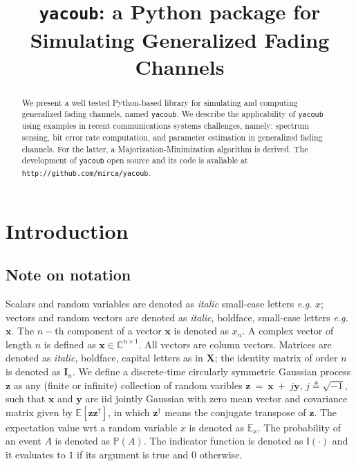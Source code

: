 \documentclass[conference, 10pt]{IEEEtran}
\begin{document}
\title{\texttt{yacoub}: a Python package for Simulating Generalized Fading Channels}

\author{
}

\maketitle

\begin{abstract}
    We present a well tested Python-based library for simulating and computing
    generalized fading channels, named \texttt{yacoub}. We describe the
    applicability of \texttt{yacoub} using examples in recent communications
    systems challenges, namely: spectrum sensing, bit error rate computation,
    and parameter estimation in generalized fading channels. For the latter,
    a Majorization-Minimization algorithm is derived. The development of
    \texttt{yacoub} open source and its code is avaliable at
    \texttt{http://github.com/mirca/yacoub}.
\end{abstract}

\IEEEpeerreviewmaketitle
\section{Introduction}

\subsection{Note on notation}
Scalars and random variables are denoted as \textit{italic} small-case letters \textit{e.g.} $x$;
vectors and random vectors are denoted as \textit{italic}, boldface, small-case letters \textit{e.g.} $\bm{x}$.
The $n-$th component of a vector $\bm{x}$ is denoted as $x_n$.
A complex vector of length $n$ is defined as $\bm{x} \in \mathbb{C}^{n\times 1}$. All
vectors are column vectors. Matrices are denoted as \textit{italic}, boldface, capital
letters as in $\bm{X}$; the identity matrix of order $n$ is denoted as $\bm{I}_n$.
We define a discrete-time circularly symmetric Gaussian process $\bm{z}$ as any (finite or infinite) collection
of random varibles $\bm{z}~=~\bm{x}~+~j\bm{y}$, $j \triangleq \sqrt{-1}$, such that
$\bm{x}$ and $\bm{y}$ are iid jointly Gaussian with zero mean vector and covariance
matrix given by $\mathbb{E}\left[\bm{z}\bm{z}^{\dagger}\right]$, in which $\bm{z}^\dagger$
means the conjugate transpose of $\bm{z}$. The expectation value wrt a random variable $x$
is denoted as $\mathbb{E}_x$. The probability of an event $A$ is denoted as $\mathbb{P}(A)$.
The indicator function is denoted as $\mathbb{I}(\cdot)$ and it evaluates to $1$ if its
argument is true and $0$ otherwise.
\end{document}
